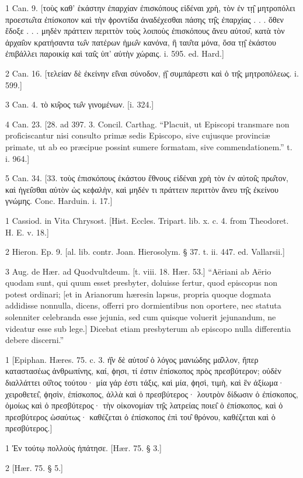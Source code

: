 1
Can. 9. [τοὺς καθ’ ἑκάστην ἐπαρχίαν ἐπισκόπους εἰδέναι χρὴ, τὸν ἐν τῃ̑ μητροπόλει προεστω̑τα ἐπίσκοπον καὶ τὴν ϕροντίδα ἀναδέχεσθαι πάσης τη̑ς ἐπαρχίας . . . ὅθεν ἔδοξε . . . μηδὲν πράττειν περιττὸν τοὺς λοιποὺς ἐπισκόπους ἄνευ αὐτου̑, κατὰ τὸν ἀρχαι̑ον κρατήσαντα τω̑ν πατέρων ἡμω̑ν κανόνα, ἢ ταυ̑τα μόνα, ὅσα τῃ̑ ἑκάστου ἐπιβάλλει παροικίᾳ καὶ ται̑ς ὑπ’ αὐτὴν χώραις. i. 595. ed. Hard.]

2
Can. 16. [τελείαν δὲ ἐκείνην εἰ̑ναι σύνοδον, ᾑ̑ συμπάρεστι καὶ ὁ τη̑ς μητροπόλεως. i. 599.]

3
Can. 4. τὸ κυ̑ρος τω̑ν γινομένων. [i. 324.]

4
Can. 23. [28. ad 397. 3. Concil. Carthag. “Placuit, ut Episcopi transmare non proficiscantur nisi consulto primæ sedis Episcopo, sive cujusque provinciæ primate, ut ab eo præcipue possint sumere formatam, sive commendationem.” t. i. 964.]

5
Can. 34. [33. τοὺς ἐπισκόπους ἑκάστου ἔθνους εἰδέναι χρὴ τὸν ἐν αὐτοι̑ς πρω̑τον, καὶ ἡγει̑σθαι αὐτὸν ὡς κεϕαλὴν, καὶ μηδέν τι πράττειν περιττὸν ἄνευ τη̑ς ἐκείνου γνώμης. Conc. Harduin. i. 17.]

1
Cassiod. in Vita Chrysost. [Hist. Eccles. Tripart. lib. x. c. 4. from Theodoret. H. E. v. 18.]

2
Hieron. Ep. 9. [al. lib. contr. Joan. Hierosolym. § 37. t. ii. 447. ed. Vallarsii.]

3
Aug. de Hær. ad Quodvultdeum. [t. viii. 18. Hær. 53.] “Aëriani ab Aërio quodam sunt, qui quum esset presbyter, doluisse fertur, quod episcopus non potest ordinari; [et in Arianorum hæresin lapsus, propria quoque dogmata addidisse nonnulla, dicens, offerri pro dormientibus non oportere, nec statuta solenniter celebranda esse jejunia, sed cum quisque voluerit jejunandum, ne videatur esse sub lege.] Dicebat etiam presbyterum ab episcopo nulla differentia debere discerni.”

1
[Epiphan. Hæres. 75. c. 3. ἠ̑ν δὲ αὐτου̑ ὁ λόγος μανιώδης μα̑λλον, ἤπερ καταστασέως ἀνθρωπίνης, καί, ϕησι, τί ἐστιν ἐπίσκοπος πρὸς πρεσβύτερον; οὐδὲν διαλλάττει οὑ̑τος τούτου· μία γάρ ἐστι τάξις, καὶ μία, ϕησὶ, τιμὴ, καὶ ἓν ἀξίωμα· χειροθετει̑, ϕησὶν, ἐπίσκοπος, ἀλλὰ καὶ ὁ πρεσβύτερος· λουτρὸν δίδωσιν ὁ ἐπίσκοπος, ὁμοίως καὶ ὁ πρεσβύτερος· τὴν οἰκονομίαν τη̑ς λατρείας ποιει̑ ὁ ἐπίσκοπος, καὶ ὁ πρεσβύτερος ὡσαύτως· καθέζεται ὁ ἐπίσκοπος ἐπὶ του̑ θρόνου, καθέζεται καὶ ὁ πρεσβύτερος.]

1
Ἐν τούτῳ πολλοὺς ἠπάτησε. [Hær. 75. § 3.]

2
[Hær. 75. § 5.]

